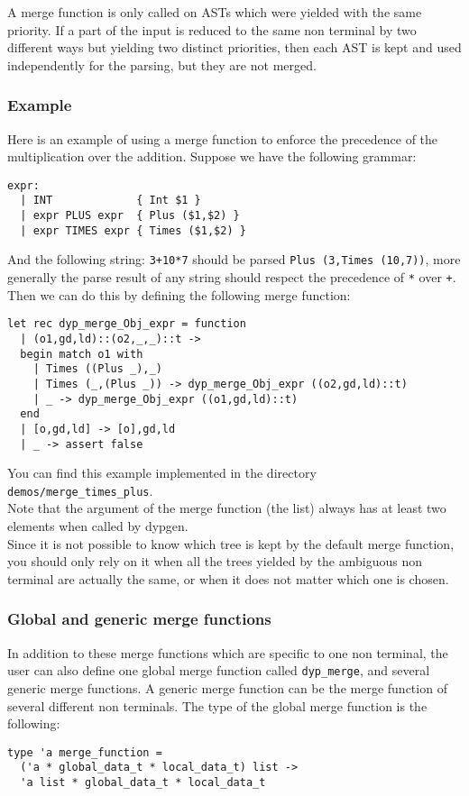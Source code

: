 \documentclass[12pt]{article}
\begin{document}
{A merge function is only called on ASTs which were yielded with the same priority. If a part of the input is reduced to the same non terminal by two different ways but yielding two distinct priorities, then each AST is kept and used independently for the parsing, but they are not merged.

\subsubsection{Example}

Here is an example of using a merge function to enforce the precedence of the multiplication over the addition. Suppose we have the following grammar:
\begin{verbatim}
expr:
  | INT             { Int $1 }
  | expr PLUS expr  { Plus ($1,$2) }
  | expr TIMES expr { Times ($1,$2) }
\end{verbatim}
And the following string: \texttt{3+10*7} should be parsed \texttt{Plus (3,Times (10,7))}, more generally the parse result of any string should respect the precedence of \texttt{*} over \texttt{+}. Then we can do this by defining the following merge function:
\begin{verbatim}
let rec dyp_merge_Obj_expr = function
  | (o1,gd,ld)::(o2,_,_)::t ->
  begin match o1 with
    | Times ((Plus _),_)
    | Times (_,(Plus _)) -> dyp_merge_Obj_expr ((o2,gd,ld)::t)
    | _ -> dyp_merge_Obj_expr ((o1,gd,ld)::t)
  end
  | [o,gd,ld] -> [o],gd,ld
  | _ -> assert false
\end{verbatim}
You can find this example implemented in the directory \verb|demos/merge_times_plus|.\\

Note that the argument of the merge function (the list) always has at least two elements when called by dypgen.\\

Since it is not possible to know which tree is kept by the default merge function, you should only rely on it when all the trees yielded by the ambiguous non terminal are actually the same, or when it does not matter which one is chosen.

\subsubsection{Global and generic merge functions}

In addition to these merge functions which are specific to one non terminal, the user can also define one global merge function called \verb|dyp_merge|, and several generic merge functions. A generic merge function can be the merge function of several different non terminals. The type of the global merge function is the following:
\begin{verbatim}
type 'a merge_function =
  ('a * global_data_t * local_data_t) list ->
  'a list * global_data_t * local_data_t
\end{verbatim}

}
\end{document}
